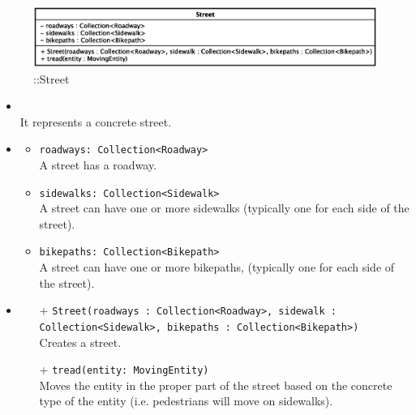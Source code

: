 \begin{figure}[h]
\centering
\includegraphics[scale=0.6,keepaspectratio]{images/solution/street.eps}
\caption{\pReactiveComponent::Street}
\label{fig:sd-app-street}
\end{figure}
\FloatBarrier
\begin{itemize}
  \item \textbf{\descr} \\
    It represents a concrete street.
  \item \textbf{\attrs}
  \begin{itemize}
    \item \texttt{roadways: Collection<Roadway>} \\
A street has a roadway.
    \item \texttt{sidewalks: Collection<Sidewalk>} \\
A street can have one or more sidewalks (typically one for each side
of the street).
    \item \texttt{bikepaths: Collection<Bikepath>} \\
A street can have one or more bikepaths, (typically one for each side
of the street).
  \end{itemize}
  \item \textbf{\ops}
  \begin{itemize}
  \item[+] \texttt{Street(roadways : Collection<Roadway>, sidewalk : Collection<Sidewalk>, bikepaths : Collection<Bikepath>)} \\
    Creates a street.
    \item[+] \texttt{tread(entity: MovingEntity)} \\
Moves the entity in the proper part of the street based on the
concrete type of the entity (i.e. pedestrians will move on sidewalks).
  \end{itemize}
\end{itemize}
